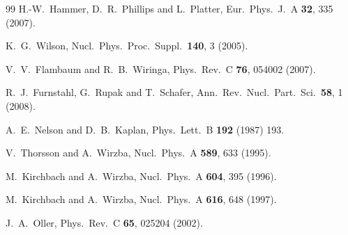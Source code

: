 \documentclass[aps,rmp,nofootinbib,twocolumn,floatfix]{revtex4}
\begin{document}
\begin{thebibliography}{99}
  H.-W.~Hammer, D.~R.~Phillips and L.~Platter,
  Eur.\ Phys.\ J.\  A {\bf 32}, 335 (2007).

  K.~G.~Wilson,
  Nucl.\ Phys.\ Proc.\ Suppl.\  {\bf 140}, 3 (2005).

  V.~V.~Flambaum and R.~B.~Wiringa,
  Phys.\ Rev.\  C {\bf 76}, 054002 (2007).


  R.~J.~Furnstahl, G.~Rupak and T.~Schafer,
  Ann.\ Rev.\ Nucl.\ Part.\ Sci.\  {\bf 58}, 1 (2008).

  A.~E.~Nelson and D.~B.~Kaplan,
  Phys.\ Lett.\  B {\bf 192} (1987) 193.

  V.~Thorsson and A.~Wirzba,
  Nucl.\ Phys.\  A {\bf 589}, 633 (1995).

  M.~Kirchbach and A.~Wirzba,
  Nucl.\ Phys.\  A {\bf 604}, 395 (1996).

  M.~Kirchbach and A.~Wirzba,
  Nucl.\ Phys.\  A {\bf 616}, 648 (1997).

  J.~A.~Oller,
  Phys.\ Rev.\  C {\bf 65}, 025204 (2002).


\end{thebibliography}
\end{document}
